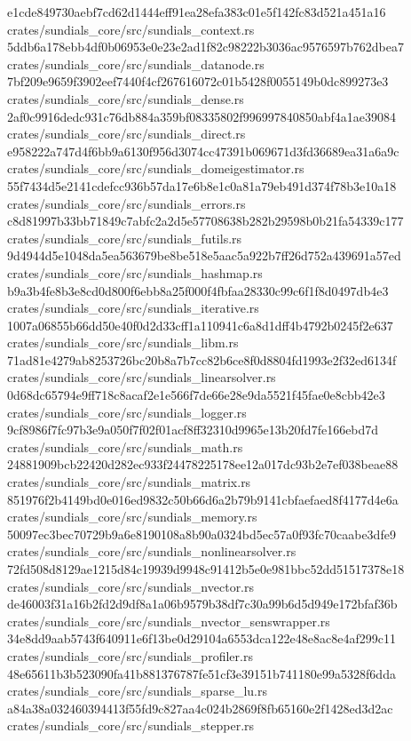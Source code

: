 \documentclass[
  10pt,
]{article}
\newenvironment{Shaded}{}{}
\newcommand{\NormalTok}[1]{#1}
\begin{document}
\begin{Shaded}
\begin{Highlighting}[]
\NormalTok{e1cde849730aebf7cd62d1444eff91ea28efa383c01e5f142fc83d521a451a16  crates/sundials\_core/src/sundials\_context.rs}
\NormalTok{5ddb6a178ebb4df0b06953e0e23e2ad1f82c98222b3036ac9576597b762dbea7  crates/sundials\_core/src/sundials\_datanode.rs}
\NormalTok{7bf209e9659f3902eef7440f4cf267616072c01b5428f0055149b0dc899273e3  crates/sundials\_core/src/sundials\_dense.rs}
\NormalTok{2af0c9916dedc931c76db884a359bf08335802f996997840850abf4a1ae39084  crates/sundials\_core/src/sundials\_direct.rs}
\NormalTok{e958222a747d4f6bb9a6130f956d3074cc47391b069671d3fd36689ea31a6a9c  crates/sundials\_core/src/sundials\_domeigestimator.rs}
\NormalTok{55f7434d5e2141cdefcc936b57da17e6b8e1c0a81a79eb491d374f78b3e10a18  crates/sundials\_core/src/sundials\_errors.rs}
\NormalTok{c8d81997b33bb71849c7abfc2a2d5e57708638b282b29598b0b21fa54339c177  crates/sundials\_core/src/sundials\_futils.rs}
\NormalTok{9d4944d5e1048da5ea563679be8be518e5aac5a922b7ff26d752a439691a57ed  crates/sundials\_core/src/sundials\_hashmap.rs}
\NormalTok{b9a3b4fe8b3e8cd0d800f6ebb8a25f000f4fbfaa28330c99c6f1f8d0497db4e3  crates/sundials\_core/src/sundials\_iterative.rs}
\NormalTok{1007a06855b66dd50e40f0d2d33cff1a110941c6a8d1dff4b4792b0245f2e637  crates/sundials\_core/src/sundials\_libm.rs}
\NormalTok{71ad81e4279ab8253726bc20b8a7b7cc82b6ce8f0d8804fd1993e2f32ed6134f  crates/sundials\_core/src/sundials\_linearsolver.rs}
\NormalTok{0d68dc65794e9ff718c8acaf2e1e566f7de66e28e9da5521f45fae0e8cbb42e3  crates/sundials\_core/src/sundials\_logger.rs}
\NormalTok{9cf8986f7fc97b3e9a050f7f02f01acf8ff32310d9965e13b20fd7fe166ebd7d  crates/sundials\_core/src/sundials\_math.rs}
\NormalTok{24881909bcb22420d282ec933f24478225178ee12a017dc93b2e7ef038beae88  crates/sundials\_core/src/sundials\_matrix.rs}
\NormalTok{851976f2b4149bd0e016ed9832c50b66d6a2b79b9141cbfaefaed8f4177d4e6a  crates/sundials\_core/src/sundials\_memory.rs}
\NormalTok{50097ec3bec70729b9a6e8190108a8b90a0324bd5ec57a0f93fc70caabe3dfe9  crates/sundials\_core/src/sundials\_nonlinearsolver.rs}
\NormalTok{72fd508d8129ae1215d84c19939d9948c91412b5e0e981bbc52dd51517378e18  crates/sundials\_core/src/sundials\_nvector.rs}
\NormalTok{de46003f31a16b2fd2d9df8a1a06b9579b38df7c30a99b6d5d949e172bfaf36b  crates/sundials\_core/src/sundials\_nvector\_senswrapper.rs}
\NormalTok{34e8dd9aab5743f640911e6f13be0d29104a6553dca122e48e8ac8e4af299c11  crates/sundials\_core/src/sundials\_profiler.rs}
\NormalTok{48e65611b3b523090fa41b881376787fe51cf3e39151b741180e99a5328f6dda  crates/sundials\_core/src/sundials\_sparse\_lu.rs}
\NormalTok{a84a38a032460394413f55fd9c827aa4c024b2869f8fb65160e2f1428ed3d2ac  crates/sundials\_core/src/sundials\_stepper.rs}

\end{Highlighting}
\end{Shaded}
\end{document}
